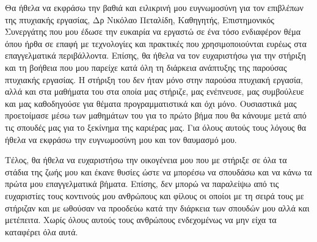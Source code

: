 \documentclass[oneside, 12pt]{book}
\begin{document}
\begin{Acknowledgement}
Θα ήθελα να εκφράσω την βαθιά και ειλικρινή μου ευγνωμοσύνη για τον επιβλέπων της πτυχιακής εργασίας, Δρ Νικόλαο Πεταλίδη, Καθηγητής, Επιστημονικός Συνεργάτης που μου έδωσε την ευκαιρία να εργαστώ σε ένα τόσο ενδιαφέρον θέμα όπου ήρθα σε επαφή με τεχνολογίες και πρακτικές που χρησιμοποιούνται ευρέως στα επαγγελματικά περιβάλλοντα. Επίσης, θα ήθελα να τον ευχαριστήσω για την στήριξη και τη βοήθεια που μου παρείχε κατά όλη τη διάρκεια ανάπτυξης της παρούσας πτυχιακής εργασίας. Η στήριξη του δεν ήταν μόνο στην παρούσα πτυχιακή εργασία, αλλά και στα μαθήματα του στα οποία μας στήριζε, μας ενέπνευσε, μας συμβούλευε και μας καθοδηγούσε για θέματα προγραμματιστικά και όχι μόνο. Ουσιαστικά μας προετοίμασε μέσω των μαθημάτων του για το πρώτο βήμα που θα κάνουμε μετά από τις σπουδές μας για το ξεκίνημα της καριέρας μας. Για όλους αυτούς τους λόγους θα ήθελα να εκφράσω την ευγνωμοσύνη μου και τον θαυμασμό μου.

Τέλος, θα ήθελα να ευχαριστήσω την οικογένεια μου που με στήριξε σε όλα τα στάδια της ζωής μου και έκανε θυσίες ώστε να μπορέσω να σπουδάσω και να κάνω τα πρώτα μου επαγγελματικά βήματα. Επίσης, δεν μπορώ να παραλείψω από τις ευχαριστίες τους κοντινούς μου ανθρώπους και φίλους οι οποίοι με τη σειρά τους με στήριζαν και με ωθούσαν να προοδεύω κατά την διάρκεια των σπουδών μου αλλά και μετέπειτα. Χωρίς όλους αυτούς τους ανθρώπους ενδεχομένως να μην είχα τα καταφέρει όλα αυτά.
\end{Acknowledgement}
\end{document}
